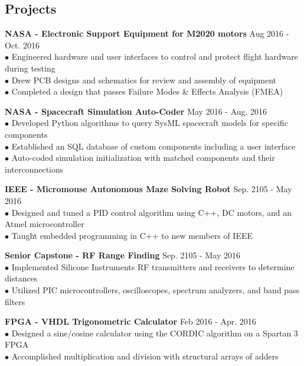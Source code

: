 \documentclass[margin,line]{res}
\begin{document}
\begin{resume}
\section{\sc Projects}
{\bf NASA - Electronic Support Equipment for M2020 motors} \hfill{Aug 2016 - Oct. 2016}\\
$\bullet$ Engineered hardware and user interfaces to control and protect flight hardware during testing \\
$\bullet$ Drew PCB designs and schematics for review and assembly of equipment \\
$\bullet$ Completed a design that passes  Failure Modes \& Effects Analysis (FMEA)

{\bf NASA - Spacecraft Simulation Auto-Coder}
\hfill{May 2016 - Aug. 2016}\\
$\bullet$ Developed Python algorithms to query SysML spacecraft models for specific components \\
$\bullet$ Established an SQL database of custom components including a user interface \\
$\bullet$ Auto-coded simulation initialization with matched components and their interconnections 

{\bf IEEE - Micromouse Autonomous Maze Solving Robot}
\hfill{Sep. 2105 - May 2016}\\
$\bullet$ Designed and tuned a PID control algorithm using C++, DC motors, and an Atmel microcontroller \\
$\bullet$ Taught embedded programming in C++ to new members of IEEE


{\bf Senior Capstone - RF Range Finding}
\hfill{Sep. 2105 - May 2016}\\
$\bullet$ Implemented Silicone Instruments RF transmitters and receivers to determine distances \\
$\bullet$ Utilized PIC microcontrollers, oscilloscopes, spectrum analyzers, and band pass filters 


{\bf FPGA - VHDL Trigonometric Calculator }
\hfill{Feb 2016 - Apr. 2016}\\
$\bullet$ Designed a sine/cosine calculator using the CORDIC algorithm on a Spartan 3 FPGA\\
$\bullet$ Accomplished multiplication and division with structural arrays of adders


\end{resume}
\end{document}
